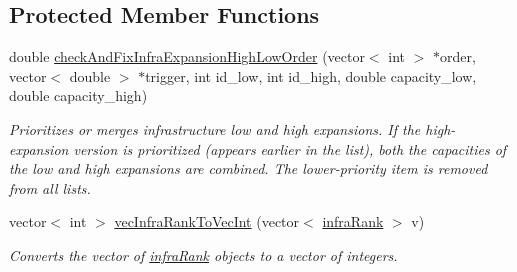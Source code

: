 \subsection*{Protected Member Functions}
\begin{DoxyCompactItemize}
\item 
double \mbox{\hyperlink{classProblem_ab9750751c2d4468a3dfe5dd6573b5179}{check\+And\+Fix\+Infra\+Expansion\+High\+Low\+Order}} (vector$<$ int $>$ $\ast$order, vector$<$ double $>$ $\ast$trigger, int id\+\_\+low, int id\+\_\+high, double capacity\+\_\+low, double capacity\+\_\+high)
\begin{DoxyCompactList}\small\item\em Prioritizes or merges infrastructure low and high expansions. If the high-\/expansion version is prioritized (appears earlier in the list), both the capacities of the low and high expansions are combined. The lower-\/priority item is removed from all lists. \end{DoxyCompactList}\item 
vector$<$ int $>$ \mbox{\hyperlink{classProblem_ab1d415f85e69eda15916cd3a708c508d}{vec\+Infra\+Rank\+To\+Vec\+Int}} (vector$<$ \mbox{\hyperlink{structinfraRank}{infra\+Rank}} $>$ v)
\begin{DoxyCompactList}\small\item\em Converts the vector of \mbox{\hyperlink{structinfraRank}{infra\+Rank}} objects to a vector of integers. \end{DoxyCompactList}\end{DoxyCompactItemize}

